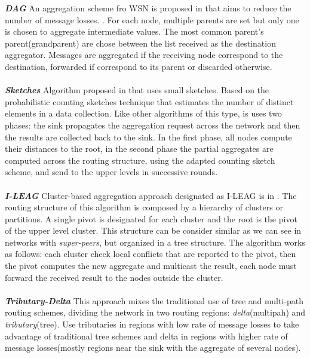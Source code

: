 \textbf{\textit{DAG}} An aggregation scheme fro WSN is proposed in \cite{motegi2006dag} that aims to reduce the number of message losses. . For each node, multiple parents are set but only one is chosen to aggregate intermediate values. The most common parent's parent(grandparent) are chose between the list received as the destination aggregator. Messages are aggregated if the receiving node correspond to the destination, forwarded if correspond to its parent or discarded otherwise.\\
\\
\textbf{\textit{Sketches}} Algorithm proposed in \cite{considine2004approximate} that uses small sketches. Based on the probabilistic counting sketches technique that estimates the number of distinct elements in a data collection. Like other algorithms of this type, is uses two phases: the sink propagates the aggregation request across the network and then the results are collected back to the sink. In the first phase, all nodes compute their distances to the root, in the second phase the partial aggregates are computed across the routing structure, using the adapted counting sketch scheme, and send to the upper levels in successive rounds.\\
\\
\textbf{\textit{I-LEAG}} Cluster-based aggregation approach designated as I-LEAG is in \cite{birk2006veracity}. The routing structure of this algorithm is composed by a hierarchy of clusters or partitions. A single pivot is designated for each cluster and the root is the pivot of the upper level cluster. This structure can be consider similar as we can see in networks with \textit{super-peers}, but organized in a tree structure. The algorithm works as follows: each cluster check local conflicts that are reported to the pivot, then the pivot computes the new aggregate and multicast the result, each node must forward the received result to the nodes outside the cluster.\\
\\
\textbf{\textit{Tributary-Delta}} 
This approach mixes the traditional use of tree and multi-path routing schemes, dividing the network in two routing regions: \textit{delta}(multipah) and \textit{tributary}(tree). Use tributaries in regions with low rate of message losses to take advantage of traditional tree schemes and delta in regions with higher rate of message losses(mostly regions near the sink with the aggregate of several nodes).

